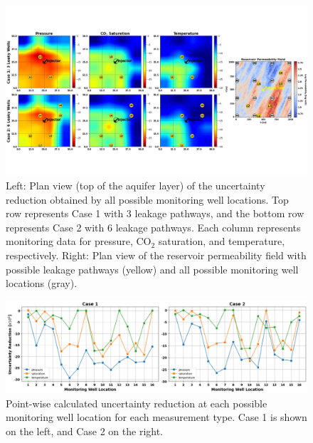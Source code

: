 \documentclass[a4paper,fleqn]{cas-sc}
\begin{document}
\begin{figure}
    \centering
    \includegraphics[width=16.5cm]{figs/Figure 10.pdf}
    \caption{Left: Plan view (top of the aquifer layer) of the uncertainty reduction obtained by all possible monitoring well locations. Top row represents Case 1 with 3 leakage pathways, and the bottom row represents Case 2 with 6 leakage pathways. Each column represents monitoring data for pressure, CO$_2$ saturation, and temperature, respectively. Right: Plan view of the reservoir permeability field with possible leakage pathways (yellow) and all possible monitoring well locations (gray).}
    \label{heatmaps}
\end{figure}

\begin{figure}
    \centering
    \includegraphics[width=16cm]{figs/Figure 11.pdf}
    \caption{Point-wise calculated uncertainty reduction at each possible monitoring well location for each measurement type. Case 1 is shown on the left, and Case 2 on the right.}
    \label{point_ur}
\end{figure}
\end{document}
